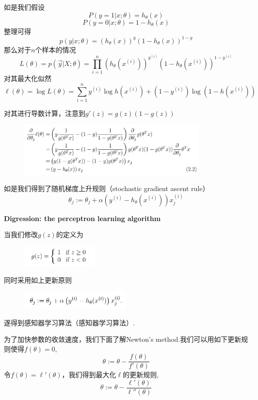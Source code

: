 \documentclass[12pt, a4paper, oneside]{ctexbook}
\begin{document}
如是我们假设\[P(y=1|x;\theta)=h_{\theta}(x)\] \[P(y=0|x;\theta)=1-h_{\theta}(x)\]整理可得\[p(y|x;\theta)=(h_{\theta}(x))^y(1-h_{\theta}(x))^{1-y}\]那么对于$n$个样本的情况\[L(\theta)=p(\vec{y}|X;\theta)=\prod_{i=1}^{n}(h_{\theta}(x^{(i)}))^{y^{(i)}}(1-h_{\theta}(x^{(i)}))^{1-y^{(i)}}\]对其最大化似然\[\ell(\theta)=\log {L(\theta)}=\sum_{i=1}^{n}y^{(i)}\log{h(x^{(i)})}+(1-y^{(i)})\log({1-h(x^{(i)})})\]

对其进行导数计算，注意到$g'(z)=g(z)(1-g(z))$

  \begin{figure}[h]
		\centering 
		\includegraphics[width=0.85\textwidth]{images26.png} 
	\end{figure}

如是我们得到了随机梯度上升规则（stochastic gradient ascent rule）\[\theta_{j}:=\theta_{j}+\alpha (y^{(i)}-h_{\theta}(x^{(i)}))x_j^{(i)}\]

\textbf{Digression: the perceptron learning algorithm}

当我们修改$g(z)$的定义为

  \begin{figure}[ht]
		\centering 
		\includegraphics[width=0.35\textwidth]{images27.png} 
	\end{figure}

同时采用如上更新原则

  \begin{figure}[ht]
		\centering 
		\includegraphics[width=0.5\textwidth]{images28.png} 
	\end{figure}

遂得到感知器学习算法（感知器学习算法）.

\hspace*{\fill}

为了加快参数的收敛速度，我们下面了解Newton's method.我们可以用如下更新规则使得$f(\theta)=0$,\[\theta := \theta-\dfrac{f(\theta)}{f'(\theta)}\]令$f(\theta)=\ell '(\theta)$，我们得到最大化$\ell$的更新规则,\[\theta:=\theta-\dfrac{\ell '(\theta)}{\ell ''(\theta)}\]
\end{document}
